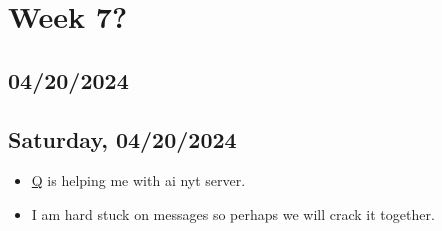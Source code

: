 \newpage
\section{Week 7?}
\subsection*{04/20/2024}
\subsection*{Saturday, 04/20/2024}
\begin{itemize}
    \item \textcolor{blue}{\href{https://github.com/queazyg}{Q}} is helping me with ai nyt server.
    \item I am hard stuck on messages so perhaps we will crack it together.
\end{itemize}

